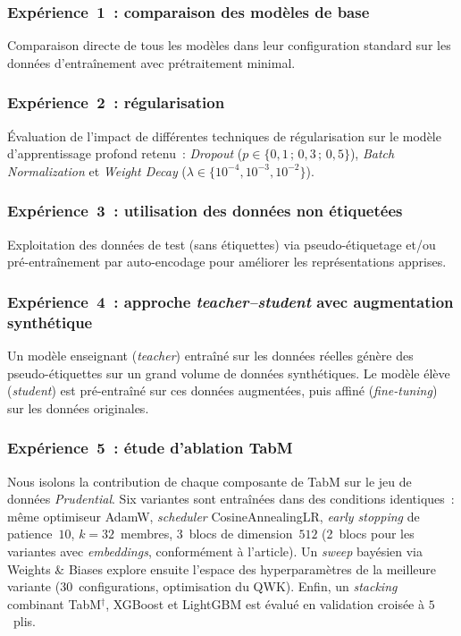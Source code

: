\documentclass[conference]{IEEEtran}
\begin{document}
\subsubsection{Expérience~1~: comparaison des modèles de base}
Comparaison directe de tous les modèles dans leur configuration standard sur les données d'entraînement avec prétraitement minimal.

\subsubsection{Expérience~2~: régularisation}
Évaluation de l'impact de différentes techniques de régularisation sur le modèle d'apprentissage profond retenu~: \textit{Dropout} ($p \in \{0{,}1\,;\, 0{,}3\,;\, 0{,}5\}$), \textit{Batch Normalization} et \textit{Weight Decay} ($\lambda \in \{10^{-4}, 10^{-3}, 10^{-2}\}$).

\subsubsection{Expérience~3~: utilisation des données non étiquetées}
Exploitation des données de test (sans étiquettes) via pseudo-étiquetage et/ou pré-entraînement par auto-encodage pour améliorer les représentations apprises.

\subsubsection{Expérience~4~: approche \textit{teacher--student} avec augmentation synthétique}
Un modèle enseignant (\textit{teacher}) entraîné sur les données réelles génère des pseudo-étiquettes sur un grand volume de données synthétiques. Le modèle élève (\textit{student}) est pré-entraîné sur ces données augmentées, puis affiné (\textit{fine-tuning}) sur les données originales.

\subsubsection{Expérience~5~: étude d'ablation TabM}
Nous isolons la contribution de chaque composante de TabM sur le jeu de données \textit{Prudential}. Six variantes sont entraînées dans des conditions identiques~: même optimiseur AdamW, \textit{scheduler} CosineAnnealingLR, \textit{early stopping} de patience~$10$, $k=32$~membres, 3~blocs de dimension~$512$ (2~blocs pour les variantes avec \textit{embeddings}, conformément à l'article). Un \textit{sweep} bayésien via Weights \& Biases explore ensuite l'espace des hyperparamètres de la meilleure variante (30~configurations, optimisation du QWK). Enfin, un \textit{stacking} combinant TabM$^{\dagger}$, XGBoost et LightGBM est évalué en validation croisée à $5$~plis.
\end{document}
